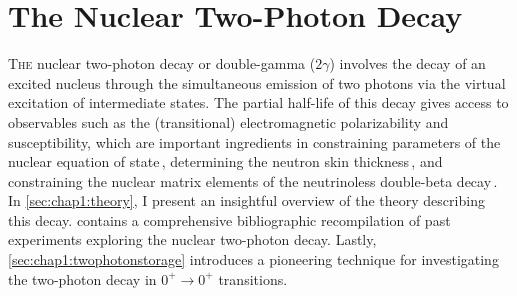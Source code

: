 
\chapter{The Nuclear Two-Photon Decay}\label{chap:100years}
\lettrine{T}{he} nuclear two-photon decay or double-gamma ($2\gamma$) involves the decay of an excited nucleus through the simultaneous emission of two photons via the virtual excitation of intermediate states. The partial half-life of this decay gives access to observables such as the (transitional) electromagnetic polarizability and susceptibility, which are important ingredients in constraining parameters of the nuclear equation of state\,\cite{EOS}, determining the neutron skin thickness\,\cite{NeutronSkin}, and constraining the nuclear matrix elements of the neutrinoless double-beta decay\,\cite{ROMEO}.
\newpar
In \cref{sec:chap1:theory}, I present an insightful overview of the theory describing this decay.  contains a comprehensive bibliographic recompilation of past experiments exploring the nuclear two-photon decay. Lastly, \cref{sec:chap1:twophotonstorage} introduces a pioneering technique for investigating the two-photon decay in \(0^{+} \rightarrow 0^{+}\) transitions.

